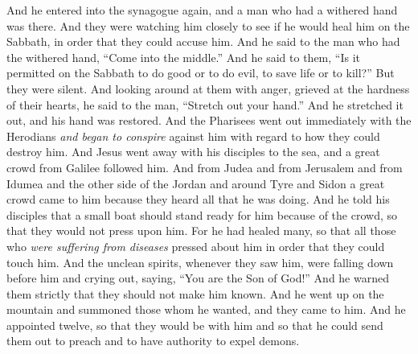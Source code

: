 \begin{biblechapter} %
 And he entered into the synagogue again, and a man who had a withered hand was there.
\verse And they were watching him closely to see if he would heal him on the Sabbath, in order that they could accuse him.
\verse And he said to the man who had the withered hand, “Come into the middle.”
\verse And he said to them, “Is it permitted on the Sabbath to do good or to do evil, to save life or to kill?” But they were silent.
\verse And looking around at them with anger, grieved at the hardness of their hearts, he said to the man, “Stretch out your hand.” And he stretched it out, and his hand was restored.
\verse And the Pharisees went out immediately with the Herodians \textit{and began to conspire} against him with regard to how they could destroy him.
 And Jesus went away with his disciples to the sea, and a great crowd from Galilee followed him. And from Judea
\verse and from Jerusalem and from Idumea and the other side of the Jordan and around Tyre and Sidon a great crowd came to him because they heard all that he was doing.
\verse And he told his disciples that a small boat should stand ready for him because of the crowd, so that they would not press upon him.
\verse For he had healed many, so that all those who \textit{were suffering from diseases} pressed about him in order that they could touch him.
\verse And the unclean spirits, whenever they saw him, were falling down before him and crying out, saying, “You are the Son of God!”
\verse And he warned them strictly that they should not make him known.
 And he went up on the mountain and summoned those whom he wanted, and they came to him.
\verse And he appointed twelve, so that they would be with him and so that he could send them out to preach
\verse and to have authority to expel demons.

\end{biblechapter}
